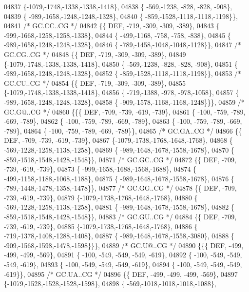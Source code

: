 \begin{DoxyCode}
04837 \{-1079,-1748,-1338,-1338,-1418\},
04838 \{ -569,-1238, -828, -828, -908\},
04839 \{ -989,-1658,-1248,-1248,-1328\},
04840 \{ -859,-1528,-1118,-1118,-1198\}\},
04841 \textcolor{comment}{/* GC.CC..CG */}
04842 \{\{  DEF, -719, -309, -309, -389\},
04843 \{ -999,-1668,-1258,-1258,-1338\},
04844 \{ -499,-1168, -758, -758, -838\},
04845 \{ -989,-1658,-1248,-1248,-1328\},
04846 \{ -789,-1458,-1048,-1048,-1128\}\},
04847 \textcolor{comment}{/* GC.CG..CG */}
04848 \{\{  DEF, -719, -309, -309, -389\},
04849 \{-1079,-1748,-1338,-1338,-1418\},
04850 \{ -569,-1238, -828, -828, -908\},
04851 \{ -989,-1658,-1248,-1248,-1328\},
04852 \{ -859,-1528,-1118,-1118,-1198\}\},
04853 \textcolor{comment}{/* GC.CU..CG */}
04854 \{\{  DEF, -719, -309, -309, -389\},
04855 \{-1079,-1748,-1338,-1338,-1418\},
04856 \{ -719,-1388, -978, -978,-1058\},
04857 \{ -989,-1658,-1248,-1248,-1328\},
04858 \{ -909,-1578,-1168,-1168,-1248\}\}\},
04859 \textcolor{comment}{/* GC.G@..CG */}
04860 \{\{\{  DEF, -709, -739, -619, -739\},
04861 \{ -100, -759, -789, -669, -789\},
04862 \{ -100, -759, -789, -669, -789\},
04863 \{ -100, -759, -789, -669, -789\},
04864 \{ -100, -759, -789, -669, -789\}\},
04865 \textcolor{comment}{/* GC.GA..CG */}
04866 \{\{  DEF, -709, -739, -619, -739\},
04867 \{-1079,-1738,-1768,-1648,-1768\},
04868 \{ -569,-1228,-1258,-1138,-1258\},
04869 \{ -989,-1648,-1678,-1558,-1678\},
04870 \{ -859,-1518,-1548,-1428,-1548\}\},
04871 \textcolor{comment}{/* GC.GC..CG */}
04872 \{\{  DEF, -709, -739, -619, -739\},
04873 \{ -999,-1658,-1688,-1568,-1688\},
04874 \{ -499,-1158,-1188,-1068,-1188\},
04875 \{ -989,-1648,-1678,-1558,-1678\},
04876 \{ -789,-1448,-1478,-1358,-1478\}\},
04877 \textcolor{comment}{/* GC.GG..CG */}
04878 \{\{  DEF, -709, -739, -619, -739\},
04879 \{-1079,-1738,-1768,-1648,-1768\},
04880 \{ -569,-1228,-1258,-1138,-1258\},
04881 \{ -989,-1648,-1678,-1558,-1678\},
04882 \{ -859,-1518,-1548,-1428,-1548\}\},
04883 \textcolor{comment}{/* GC.GU..CG */}
04884 \{\{  DEF, -709, -739, -619, -739\},
04885 \{-1079,-1738,-1768,-1648,-1768\},
04886 \{ -719,-1378,-1408,-1288,-1408\},
04887 \{ -989,-1648,-1678,-1558,-3080\},
04888 \{ -909,-1568,-1598,-1478,-1598\}\}\},
04889 \textcolor{comment}{/* GC.U@..CG */}
04890 \{\{\{  DEF, -499, -499, -499, -569\},
04891 \{ -100, -549, -549, -549, -619\},
04892 \{ -100, -549, -549, -549, -619\},
04893 \{ -100, -549, -549, -549, -619\},
04894 \{ -100, -549, -549, -549, -619\}\},
04895 \textcolor{comment}{/* GC.UA..CG */}
04896 \{\{  DEF, -499, -499, -499, -569\},
04897 \{-1079,-1528,-1528,-1528,-1598\},
04898 \{ -569,-1018,-1018,-1018,-1088\},

\end{DoxyCode}
